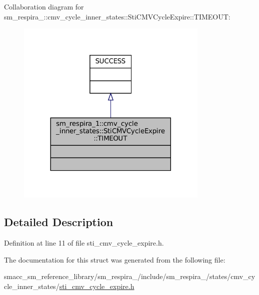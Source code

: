 Collaboration diagram for sm\+\_\+respira\+\_\+:\+:cmv\+\_\+cycle\+\_\+inner\+\_\+states\+:\+:Sti\+C\+M\+V\+Cycle\+Expire\+:\+:T\+I\+M\+E\+O\+UT\+:
\nopagebreak
\begin{figure}[H]
\begin{center}
\leavevmode
\includegraphics[width=260pt]{structsm__respira__1_1_1cmv__cycle__inner__states_1_1StiCMVCycleExpire_1_1TIMEOUT__coll__graph}
\end{center}
\end{figure}


\subsection{Detailed Description}


Definition at line 11 of file sti\+\_\+cmv\+\_\+cycle\+\_\+expire.\+h.



The documentation for this struct was generated from the following file\+:\begin{DoxyCompactItemize}
\item 
smacc\+\_\+sm\+\_\+reference\+\_\+library/sm\+\_\+respira\+\_/include/sm\+\_\+respira\+\_/states/cmv\+\_\+cycle\+\_\+inner\+\_\+states/\hyperlink{sti__cmv__cycle__expire_8h}{sti\+\_\+cmv\+\_\+cycle\+\_\+expire.\+h}\end{DoxyCompactItemize}
